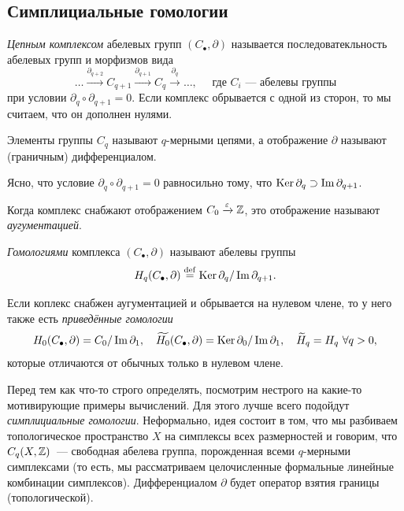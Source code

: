  \subsection{Симплициальные гомологии}

    \begin{definition}
        \emph{Цепным комплексом} абелевых групп $(C_{\bullet}, \partial)$ называется последоватекльность абелевых групп и морфизмов вида
        \[ \ldots \xrightarrow{ \partial_{q + 2}} C_{q + 1} \xrightarrow{\partial_{q + 1}} C_{q} \xrightarrow{\partial_{q}} \ldots, \quad \text{ где } C_{i} \text{~--- абелевы группы} \]
        при условии $\partial_{q} \circ \partial_{q + 1} = 0$. Если комплекс обрывается с одной из сторон, то мы считаем, что он дополнен нулями.

        Элементы группы $C_{q}$ называют $q$-мерными цепями, а отображение $\partial$ называют (граничным) дифференциалом.
    \end{definition}

    \begin{remark}
       Ясно, что условие $\partial_{q} \circ \partial_{q + 1} = 0$ равносильно тому, что $\operatorname{Ker}{\partial_{q}} \supset \mathop{\mathrm{Im}}\nolimits{\partial_{q + 1}}$.
    \end{remark}

    \begin{remark}
       Когда комплекс снабжают отображением $C_0 \xrightarrow{\varepsilon}  \mathbb{Z}$, это отображение называют \emph{аугументацией}.
    \end{remark}


    \begin{definition}
        \emph{Гомологиями} комплекса $(C_{\bullet}, \partial)$ называют абелевы группы
        \[ H_{q}(C_{\bullet}, \partial) \stackrel{\mathrm{def}}{=} \operatorname{Ker}{\partial_{q}} / \mathop{\mathrm{Im}}\nolimits{\partial_{q + 1}}. \]

        Если коплекс снабжен аугументацией и обрывается на нулевом члене, то у него также есть \emph{приведённые гомологии}
        \[ H_{0}(C_{\bullet}, \partial) = C_0/\Im{\partial_{1}}, \quad \widetilde{H_0}(C_{\bullet}, \partial) = \Ker{\partial_{0}}/\Im{\partial_{1}}, \quad \widetilde{H}_{q} = H_{q} \ \forall q > 0, \]
        которые отличаются от обычных только в нулевом члене.
    \end{definition}

    Перед тем как что-то строго определять, посмотрим нестрого на какие-то мотивирующие примеры вычислений. Для этого лучше всего подойдут \emph{симплициальные гомологии}.
    Неформально, идея состоит в том, что мы разбиваем топологическое пространство $X$ на симплексы всех размерностей и говорим, что $C_{q}(X, \mathbb{Z})$~--- свободная абелева группа, порожденная всеми
    $q$-мерными симплексами (то есть, мы рассматриваем целочисленные формальные линейные комбинации симплексов). Дифференциалом $\partial$ будет оператор взятия границы (топологической).

